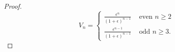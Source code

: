 \begin{proof}
\[
V_{n}=
\left\{
\begin{array}{rl}
\frac{\epsilon^{n}}{(1+\epsilon)^{n-1}} & \mbox{ even }n\geq 2\\
\frac{\epsilon^{n-1}}{(1+\epsilon)^{n-1}} & \mbox{ odd }n\geq 3. 
\end{array} \right.
\]   
\end{proof}



